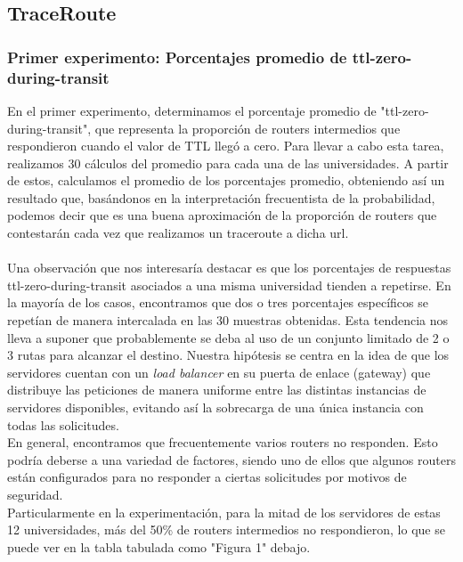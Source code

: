 \documentclass{article}
\begin{document}
\subsection{TraceRoute}

    \subsubsection{Primer experimento: Porcentajes promedio de ttl-zero-during-transit}
        En el primer experimento, determinamos el porcentaje promedio de "ttl-zero-during-transit", que representa la proporción de routers intermedios que respondieron cuando el valor de TTL llegó a cero. Para llevar a cabo esta tarea, realizamos 30 cálculos del promedio para cada una de las universidades. A partir de estos, calculamos el promedio de los porcentajes promedio, obteniendo así un resultado que, basándonos en la interpretación frecuentista de la probabilidad, podemos decir que es una buena aproximación de la proporción de routers que contestarán cada vez que realizamos un traceroute a dicha url.\\
        \\
        Una observación que nos interesaría destacar es que los porcentajes de respuestas ttl-zero-during-transit asociados a una misma universidad tienden a repetirse. En la mayoría de los casos, encontramos que dos o tres porcentajes específicos se repetían de manera intercalada en las 30 muestras obtenidas. Esta tendencia nos lleva a suponer que probablemente se deba al uso de un conjunto limitado de 2 o 3 rutas para alcanzar el destino. Nuestra hipótesis se centra en la idea de que los servidores cuentan con un \textit{load balancer} en su puerta de enlace (gateway) que distribuye las peticiones de manera uniforme entre las distintas instancias de servidores disponibles, evitando así la sobrecarga de una única instancia con todas las solicitudes.\\
        En general, encontramos que frecuentemente varios routers no responden. Esto podría deberse a una variedad de factores, siendo uno de ellos que algunos routers están configurados para no responder a ciertas solicitudes por motivos de seguridad.\\
        Particularmente en la experimentación, para la mitad de los servidores de estas 12 universidades, más del 50\% de routers intermedios no respondieron, lo que se puede ver en la tabla tabulada como "Figura 1" debajo. \\
        \\
\end{document}
